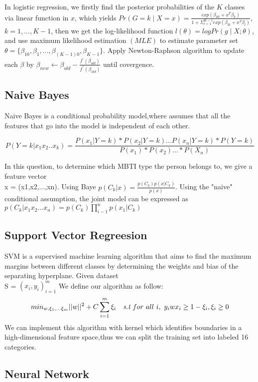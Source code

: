 \documentclass{article}
\begin{document}
In logistic regression, we firstly find the posterior probabilities of the $K$ classes via linear function in $x$, which yields $Pr\left(G = k\mid X = x\right) = \frac{exp\left(\beta_{k0}+x^{T} \beta_{k}\right)}{1+\Sigma_{l=1}^{K-1}exp\left(\beta_{l0}+x^{T} \beta_{l}\right)}$, $k = 1,...,K-1$, then we get the log-likelihood function $l(\theta) = logPr\left(g\mid X; \theta\right) $, and use maximum likelihood estimation $\left(MLE\right)$ to estimate parameter set $\theta = \{\beta_{10},\beta_1,...,\beta_{\left(K-1\right)0},\beta_{K-1} \}$. Apply Newton-Raphson algorithm to update each $\beta$ by $\beta_{new} \leftarrow \beta_{old} - \frac{f^{'}\left(\beta_{old}\right)}{f^{''}\left(\beta_{old}\right)}$ until covergence.

\subsection{Naive Bayes}
Naive Bayes is a conditional probability model,where  assumes that all the features that go into the model is independent of each other.

$$ P(Y= k|x_1x_2..x_k)= \frac{P(x_1|Y=k)*P(x_2|Y=k)...P(x_n|Y=k)*P(Y = k) }{ P(x_1)*P(x_2)...* P(X_n)}$$

In this question, to determine which MBTI type the person belongs to, we give a feature vector\\ x = (x1,x2,...,xn). Using Baye $ p(C_k|x) = \frac{p(C_k)p(x|C_k)}{p(x)} $. Using the "naive" conditional assumption, the joint model can be expressed as $p(C_k|x_1x_2...x_n) = p(C_k)\prod_{i-1}^n p(x_1|C_k)$ 

\subsection{Support Vector Regreesion}

SVM is a supervised machine learning algorithm that aims to find the maximum margins between different classes by determining the weights and bias of the separating hyperplane. Given dataset \\S = ${(x_i,y_i)}_{i=1}^m $ We define our algorithm as follow:
$$ min_{w,\xi_1,...\xi_m}||w||^2 + C\sum_{i=1}^m \xi_i \quad \emph{s.t} \ for \ all \ i, \ y_i w x_i \ge 1 - \xi_i, \xi_i \ge 0 $$
We can implement this algorithm with kernel which identifies boundaries in a high-dimensional feature space,thus  we can split the training set into labeled 16 categories.
\subsection{Neural Network}
\end{document}
